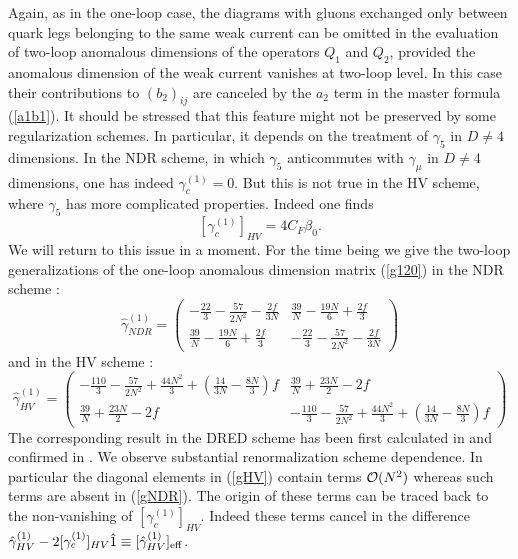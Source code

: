 \documentclass[12pt]{article}
\newcommand{\be}{\begin{equation}}
\newcommand{\ee}{\end{equation}}
\newcommand{\ord}{{\cal O}}
\begin{document}
\begin{itemize}
\begin{itemize}
\begin{itemize}
Again, as in the one-loop case, the diagrams with gluons exchanged only
between quark legs belonging to the same weak current can be omitted in
the evaluation of two-loop anomalous dimensions of the operators
$Q_1$ and $Q_2$, provided the anomalous dimension of the weak current
vanishes at two-loop level. In this case their contributions to
$(b_2)_{ij}$ are canceled by the $a_2$ term in the master formula
(\ref{a1b1}). It should be stressed that this
feature might not be preserved by some regularization schemes. In particular,
it depends on the treatment of $\gamma_5$ in $D\not=4$ dimensions.
In the NDR scheme, in which $\gamma_5$ anticommutes with $\gamma_\mu$ in
$D\not=4$ dimensions, one has indeed $\gamma^{(1)}_c=0$. But this is
not true in the HV scheme, where $\gamma_5$ has more complicated
properties. Indeed one finds \cite{WEISZ}
\be\label{anc}
[\gamma_c^{(1)}]_{HV}=4 C_F \beta_0.
\ee 
We will return to this issue in a moment. For the time being we 
give the two-loop generalizations of the one-loop anomalous
dimension matrix (\ref{g120}) in the NDR scheme \cite{WEISZ}:
\begin{equation}\label{gNDR} 
 \hat\gamma^{(1)}_{NDR}=
 \left(\begin{array}{cc}
 -\frac{22}{3}-\frac{57}{2 N^2}-\frac{2f}{3N} & 
  \frac{39}{N}-\frac{19N}{6}+\frac{2f}{3} \\
 \frac{39}{N}-\frac{19N}{6}+\frac{2f}{3} & 
 -\frac{22}{3}-\frac{57}{2 N^2}-\frac{2f}{3N}
    \end{array}\right)   
\end{equation}
and in the HV scheme \cite{WEISZ}:
\begin{equation}\label{gHV} 
 \hat\gamma^{(1)}_{HV}=
 \left(\begin{array}{cc}
 -\frac{110}{3}-\frac{57}{2 N^2}+\frac{44 N^2}{3}+
\left(\frac{14}{3N}-\frac{8N}{3}\right) f & 
  \frac{39}{N}+\frac{23N}{2}-2f \\
  \frac{39}{N}+\frac{23N}{2}-2f  & 
 -\frac{110}{3}-\frac{57}{2 N^2}+\frac{44 N^2}{3}+
\left(\frac{14}{3N}-\frac{8N}{3}\right) f
    \end{array}\right)   
\end{equation}
The corresponding result in the DRED scheme has been first
calculated in \cite{ACMP} and confirmed in \cite{WEISZ}.
We observe substantial renormalization scheme dependence. 
In particular the diagonal elements in (\ref{gHV}) contain
terms $\ord(N^2)$ whereas such terms are absent in (\ref{gNDR}).
The origin of these terms can be traced back to the non-vanishing
of $[\gamma_c^{(1)}]_{HV}$. Indeed these terms cancel in the
difference $\hat\gamma^{(1)}_{HV}-2 [\gamma_c^{(1)}]_{HV} \hat 1 
\equiv[\hat\gamma^{(1)}_{HV}]_{\rm eff}$.


\end{itemize}
\end{itemize}
\end{itemize}
\end{document}
